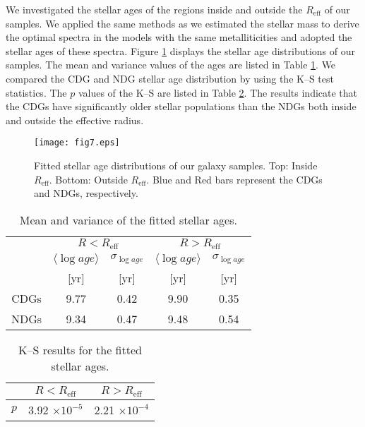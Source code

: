 \documentclass[fleqn,usenatbib]{mnras}
\begin{document}
We investigated the stellar ages of the regions inside and outside the $R_\mathrm{eff}$ of our samples.
We applied the same methods as we estimated the stellar mass to derive the optimal spectra in the \citet{2003MNRAS.344.1000B} models with the same metalliticities and adopted the stellar ages of these spectra.
Figure \ref{fig7} displays the stellar age distributions of our samples.
The mean and variance values of the ages are listed in Table \ref{tab:table4}.
We compared the CDG and NDG stellar age distribution by using the K--S test statistics.
The $p$ values of the K--S are listed in Table \ref{tab:table5}.
The results indicate that the CDGs have significantly older stellar populations than the NDGs both inside and outside the effective radius.
\begin{figure}
        \texttt{[image: fig7.eps]}
    \caption{Fitted stellar age distributions of our galaxy samples.
    Top: Inside $R_\mathrm{eff}$. Bottom: Outside $R_\mathrm{eff}$.
    Blue and Red bars represent the CDGs and NDGs, respectively.}
    \label{fig7}
\end{figure}

\begin{table}
        \centering
        \caption{Mean and variance of the fitted stellar ages.}
        \label{tab:table4}
        \begin{tabular}{ccccc} 
                \hline
                & \multicolumn{2}{c}{$R<R_\mathrm{eff}$} & \multicolumn{2}{c}{$R>R_\mathrm{eff}$}\\
                & $\langle \log age \rangle$ & $\sigma_{\log age}$ & $\langle \log age \rangle$ & $\sigma_{\log age}$ \\
                & [yr] & [yr] & [yr] & [yr] \\
                \hline
                CDGs & 9.77 & 0.42 & 9.90 & 0.35 \\
                NDGs & 9.34 & 0.47 & 9.48 & 0.54 \\
                \hline
        \end{tabular}
\end{table}

\begin{table}
        \centering
        \caption{K--S results for the fitted stellar ages.}
        \label{tab:table5}
        \begin{tabular}{lcc} 
                \hline
                & $R<R_\mathrm{eff}$ & $R>R_\mathrm{eff}$\\
                \hline
                $p$ & 3.92 $\times 10^{-5}$ & 2.21 $\times 10^{-4}$ \\
                \hline
        \end{tabular}
\end{table}
\end{document}
